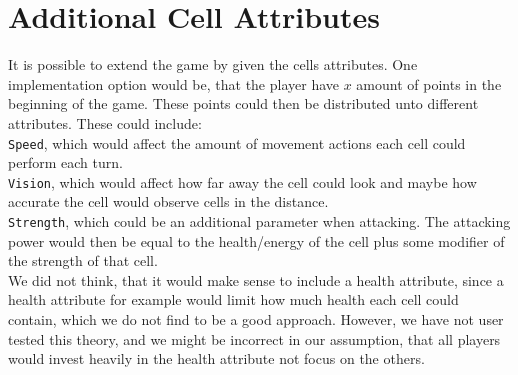 \section{Additional Cell Attributes}
It is possible to extend the game by given the cells attributes.
One implementation option would be, that the player have $x$ amount of points in the beginning of the game.
These points could then be distributed unto different attributes.
These could include:\\

\verb|Speed|, which would affect the amount of movement actions each cell could perform each turn.\\
\verb|Vision|, which would affect how far away the cell could look and maybe how accurate the cell would observe cells in the distance.\\
\verb|Strength|, which could be an additional parameter when attacking. The attacking power would then be equal to the health/energy of the cell plus some modifier of the strength of that cell.\\

We did not think, that it would make sense to include a health attribute, since a health attribute for example would limit how much health each cell could contain, which we do not find to be a good approach.
However, we have not user tested this theory, and we might be incorrect in our assumption, that all players would invest heavily in the health attribute not focus on the others.